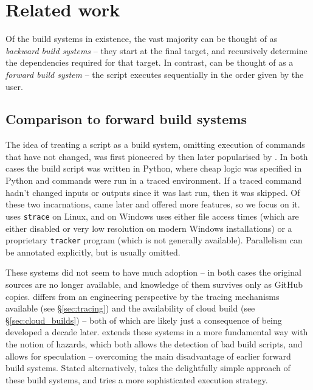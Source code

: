 \section{Related work}
\label{sec:related}

Of the build systems in existence, the vast majority can be thought of as \emph{backward build systems} -- they start at the final target, and recursively determine the dependencies required for that target. In contrast, \Rattle can be thought of as a \emph{forward build system} -- the script executes sequentially in the order given by the user.

\subsection{Comparison to forward build systems}

The idea of treating a script as a build system, omitting execution of commands that have not changed, was first pioneered by \Memoize \cite{memoize} then later popularised by \Fabricate \cite{fabricate}. In both cases the build script was written in Python, where cheap logic was specified in Python and commands were run in a traced environment. If a traced command hadn't changed inputs or outputs since it was last run, then it was skipped. Of these two incarnations, \Fabricate came later and offered more features, so we focus on it. \Fabricate uses \texttt{strace} on Linux, and on Windows uses either file access times (which are either disabled or very low resolution on modern Windows installations) or a proprietary \texttt{tracker} program (which is not generally available). Parallelism can be annotated explicitly, but is usually omitted.

These systems did not seem to have much adoption -- in both cases the original sources are no longer available, and knowledge of them survives only as GitHub copies. \Rattle differs from an engineering perspective by the tracing mechanisms available (see \S\ref{sec:tracing}) and the availability of cloud build (see \S\ref{sec:cloud_builds}) -- both of which are likely just a consequence of being developed a decade later. \Rattle extends these systems in a more fundamental way with the notion of hazards, which both allows the detection of bad build scripts, and allows for speculation -- overcoming the main disadvantage of earlier forward build systems. Stated alternatively, \Rattle takes the delightfully simple approach of these build systems, and tries a more sophisticated execution strategy.

